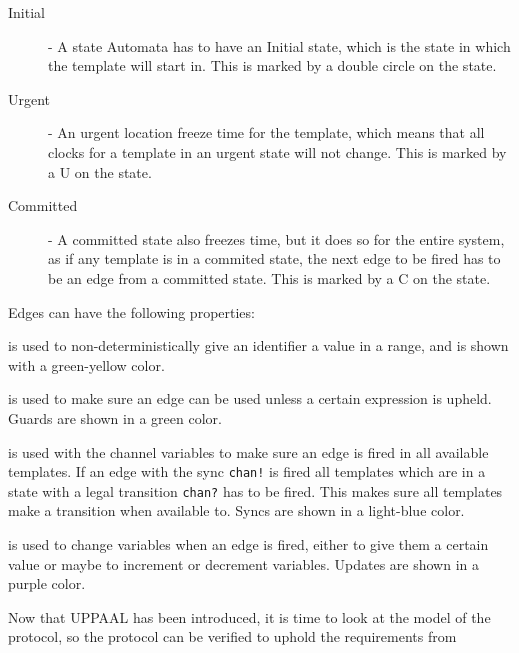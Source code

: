 \begin{description}
	\item [Initial] - A state Automata has to have an Initial state, which is the state in which the template will start in. This is marked by a double circle on the state.
	\item [Urgent] - An urgent location freeze time for the template, which means that all clocks for a template in an urgent state will not change. This is marked by a U on the state.
	\item [Committed] - A committed state also freezes time, but it does so for the entire system, as if any template is in a commited state, the next edge to be fired has to be an edge from a committed state. This is marked by a C on the state.
\end{description}

\noindent

Edges can have the following properties:

\begin{description}[labelindent=\parindent,labelsep=1ex]
    \item[Select] is used to non-deterministically give an identifier a value in a range, and is shown with a green-yellow color.
    \item[Guard] is used to make sure an edge can be used unless a certain expression is upheld. Guards are shown in a green color.
    \item[Sync] is used with the channel variables to make sure an edge is fired in all available templates. If an edge with the sync \texttt{chan!} is fired all templates which are in a state with a legal transition \texttt{chan?} has to be fired. This makes sure all templates make a transition when available to. Syncs are shown in a light-blue color.
    \item[Update] is used to change variables when an edge is fired, either to give them a certain value or maybe to increment or decrement variables. Updates are shown in a purple color.
\end{description}

\noindent
Now that UPPAAL has been introduced, it is time to look at the model of the protocol, so the protocol can be verified to uphold the requirements from 
